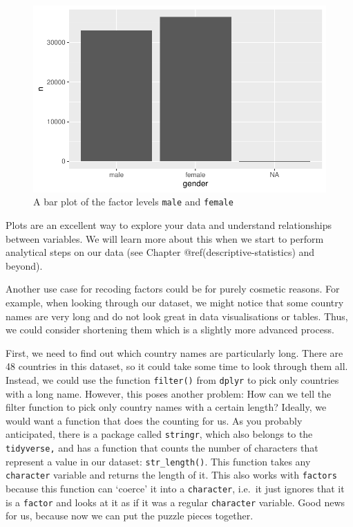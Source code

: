 \documentclass[
  letterpaper,
]{krantz}
\begin{document}
\begin{figure}[H]

{\centering \includegraphics{07_data_wrangling_files/figure-pdf/gender-bar-plot-1.pdf}

}

\caption{A bar plot of the factor levels \texttt{male} and
\texttt{female}}

\end{figure}%

Plots are an excellent way to explore your data and understand
relationships between variables. We will learn more about this when we
start to perform analytical steps on our data (see Chapter
@ref(descriptive-statistics) and beyond).

Another use case for recoding factors could be for purely cosmetic
reasons. For example, when looking through our dataset, we might notice
that some country names are very long and do not look great in data
visualisations or tables. Thus, we could consider shortening them which
is a slightly more advanced process.

First, we need to find out which country names are particularly long.
There are 48 countries in this dataset, so it could take some time to
look through them all. Instead, we could use the function
\texttt{filter()} from \texttt{dplyr} to pick only countries with a long
name. However, this poses another problem: How can we tell the filter
function to pick only country names with a certain length? Ideally, we
would want a function that does the counting for us. As you probably
anticipated, there is a package called \texttt{stringr}, which also
belongs to the \texttt{tidyverse,} and has a function that counts the
number of characters that represent a value in our dataset:
\texttt{str\_length()}. This function takes any \texttt{character}
variable and returns the length of it. This also works with
\texttt{factors} because this function can `coerce' it into a
\texttt{character}, i.e.~it just ignores that it is a \texttt{factor}
and looks at it as if it was a regular \texttt{character} variable. Good
news for us, because now we can put the puzzle pieces together.
\end{document}
